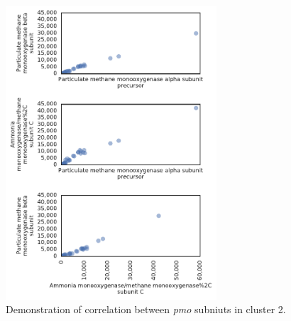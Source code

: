 \begin{figure}[H]
\centering
    \includegraphics[width=0.7\textwidth]{./tex/chapter3/figures/170402_correlations_between_pMMO_subunits--set2.pdf}
    \begin{singlespace}
    \caption[Demonstration of correlation between \textit{pmo} subniuts in cluster 2]{
        Demonstration of correlation between \textit{pmo} subniuts in cluster 2.}
    \label{fig:pmo_cor2}
    \end{singlespace}
\end{figure}

